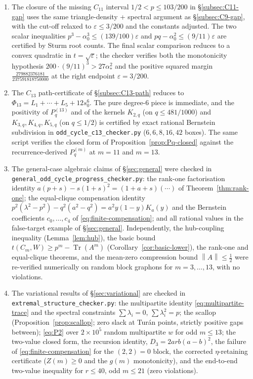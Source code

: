 \documentclass[11pt]{article}
\newcommand{\Tr}{\operatorname{Tr}}
\newcommand{\norm}[1]{\left\|#1\right\|}
\newcommand{\eps}{\varepsilon}
\begin{document}
\begin{enumerate}[label=\textup{(\arabic*)}]
    \item The closure of the missing $C_{11}$ interval $1/2<p\le103/200$ in \S\ref{subsec:C11-gap} uses the same triangle-density + spectral argument as \S\ref{subsec:C9-gap}, with the cut-off relaxed to $\eps\le 3/200$ and the constants adjusted.  The two scalar inequalities $p^3-\alpha_0^3\le(139/100)\eps$ and $pq-\alpha_0^2\le(9/11)\eps$ are certified by Sturm root counts.  The final scalar comparison reduces to a convex quadratic in $t=\sqrt\eps$; the checker verifies both the monotonicity hypothesis $200\cdot(9/11)^3>27\alpha_*^2$ and the positive squared margin $\tfrac{279882376181}{237591818750000}$ at the right endpoint $\eps=3/200$.
    \item The $C_{13}$ path-certificate of \S\ref{subsec:C13-path} reduces to $\Phi_{13}=L_1+\cdots+L_5+12s_0^6$.  The pure degree-$6$ piece is immediate, and the positivity of $P_q^{(13)}$ and of the kernels $K_{2,q}$ (on $q\le481/1000$) and $K_{3,q},K_{4,q},K_{5,q}$ (on $q\le1/2$) is certified by exact rational Bernstein subdivision in \texttt{odd\_cycle\_c13\_checker.py} ($6,6,8,16,42$ boxes).  The same script verifies the closed form of Proposition~\ref{prop:Pq-closed} against the recurrence-derived $P_q^{(m)}$ at $m=11$ and $m=13$.
    \item The general-case algebraic claims of \S\ref{sec:general} were checked in \texttt{general\_odd\_cycle\_progress\_checker.py}: the rank-one factorisation identity $a(p+s)-s(1+s)^2=(1+a+s)(\cdots)$ of Theorem~\ref{thm:rank-one}; the equal-clique compensation identity $p^2(\lambda^2-p^2)-q^2(a^2-q^2)=a^2y(1-y)K_a(y)$ and the Bernstein coefficients $c_0,\ldots,c_4$ of \eqref{eq:finite-compensation}; and all rational values in the false-target example of \S\ref{sec:general}.  Independently, the hub-coupling inequality (Lemma~\ref{lem:hub}), the basic bound $t(C_m,W)\ge p^m-\Tr(A^m)$ (Corollary~\ref{cor:basic-lower}), the rank-one and equal-clique theorems, and the mean-zero compression bound $\norm A\le\tfrac12$ were re-verified numerically on random block graphons for $m=3,\ldots,13$, with no violations.
    \item The variational results of \S\ref{sec:variational} are checked in \texttt{extremal\_structure\_checker.py}: the multipartite identity \eqref{eq:multipartite-trace} and the spectral constraints $\sum\lambda_i=0$, $\sum\lambda_i^2=p$; the scallop (Proposition~\ref{prop:scallop}; zero slack at Tur\'an points, strictly positive gaps between); \eqref{eq:P2} over $2\times10^5$ random multipartite $w$ for odd $m\le13$; the two-value closed form, the recursion identity, $D_3=2arb(a-b)^2$, the failure of \eqref{eq:finite-compensation} for the $(2,2)=0$ block, the corrected $\eta$-retaining certificate ($Z(m)\ge0$ and the $g(m)$ monotonicity), and the end-to-end two-value inequality for $r\le40$, odd $m\le21$ (zero violations).

\end{enumerate}
\end{document}
